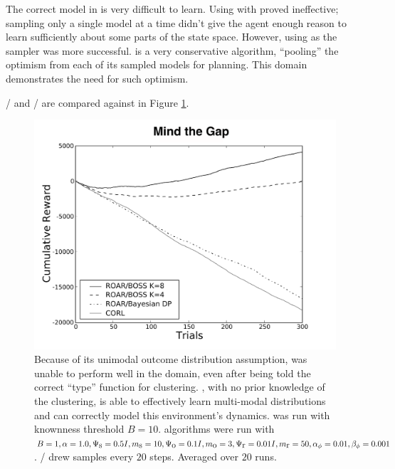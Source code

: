 The correct model in  is very difficult to learn. Using  with  proved ineffective; sampling only a single model at a time didn't give the agent enough reason to learn sufficiently about some parts of the state space. However, using  as the sampler was more successful.  is a very conservative algorithm, ``pooling'' the optimism from each of its sampled models for planning. This domain demonstrates the need for such optimism.

/ and / are compared against  in Figure \ref{fig:bridge2}.

\begin{figure}[t]
\vskip 0.2in
\begin{center}
\centerline{\includegraphics[width=\columnwidth]{figures/bridge2Figure}}
\caption{Because of its unimodal outcome distribution assumption,  was unable to perform well in the  domain, even after being told the correct ``type'' function for clustering. , with no prior knowledge of the clustering, is able to effectively learn multi-modal distributions and can correctly model this environment's dynamics.  was run with knownness threshold $B=10$.  algorithms were run with $B=1, \alpha=1.0,\Psi_{\mbox s}=0.5I, m_{\mbox s}=10, \Psi_{\mbox o}=0.1I, m_{\mbox o}=3, \Psi_{\mbox r}=0.01I,m_{\mbox r}=50,\alpha_\phi=0.01,\beta_\phi=0.001$. / drew samples every $20$ steps. Averaged over $20$ runs.}
\label{fig:bridge2}
\end{center}
\vskip -0.2in
\end{figure} 






